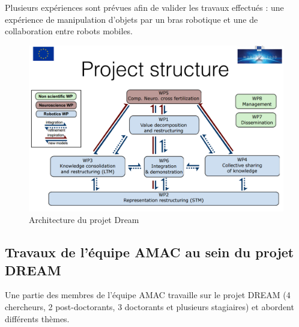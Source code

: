 \documentclass{llncs}
\begin{document}
Plusieurs expériences sont prévues afin de valider les travaux effectués : une expérience de manipulation d'objets par un bras robotique et une de collaboration entre robots mobiles.



\begin{figure}
  \begin{center}
    \includegraphics[width=.8\textwidth]{figures/project_structure.png}
  \end{center}
  \caption{Architecture du projet Dream}
  \label{fig:dream}
\end{figure}




\subsection{Travaux de l'équipe AMAC au sein du projet DREAM}

Une partie des membres de l'équipe AMAC travaille sur le projet DREAM (4 chercheurs, 2 post-doctorants, 3 doctorants et plusieurs stagiaires) et abordent différents thèmes.
\end{document}
